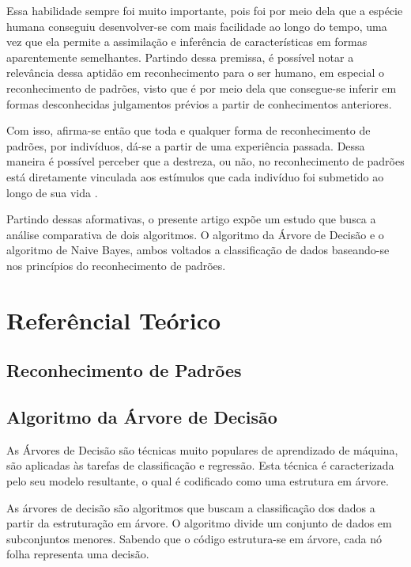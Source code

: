 \documentclass[preprint,12pt]{elsarticle}
\begin{document}
	Essa habilidade sempre foi muito importante, pois foi por meio dela que a esp\'ecie humana conseguiu desenvolver-se com mais facilidade ao longo do tempo, uma vez que ela permite a assimila\c c\~ao e infer\^encia de caracter\'isticas em formas aparentemente semelhantes. Partindo dessa premissa, \'e poss\'ivel notar a relev\^ancia dessa aptid\~ao em reconhecimento para o ser humano, em especial o reconhecimento de padr\~oes, visto que \'e por meio dela que consegue-se inferir em formas desconhecidas julgamentos pr\'evios a partir de conhecimentos anteriores.
	
	Com isso, afirma-se ent\~ao que toda e qualquer forma de reconhecimento de padr\~oes, por indiv\'iduos, d\'a-se a partir de uma experi\^encia passada. Dessa maneira \'e poss\'ivel perceber que a destreza, ou n\~ao, no reconhecimento de padr\~oes está diretamente vinculada aos est\'imulos que cada indiv\'iduo foi submetido ao longo de sua vida \cite{Prado:2008}.
	
	Partindo dessas aformativas, o presente artigo exp\~oe um estudo que busca a an\'alise comparativa de dois algoritmos. O algoritmo da \'Arvore de Decis\~ao e o algoritmo de Naive Bayes, ambos voltados a classifica\c c\~ao de dados baseando-se nos princ\'ipios do reconhecimento de padr\~oes.
	\section{Refer\^encial Te\'orico}
	\label{S:2}
	
	\subsection{Reconhecimento de Padr\~oes}
	
	\subsection{Algoritmo da \'Arvore de Decis\~ao}
	
	As  \'Arvores de Decis\~ao s\~ao t\'ecnicas muito populares de aprendizado de m\'aquina, s\~ao aplicadas \`as tarefas de classifica\c c\~ao e regress\~ao. Esta t\'ecnica \'e caracterizada pelo seu modelo resultante, o qual \'e codificado como uma estrutura em \'arvore\cite{Nuti:2019}. 
	
	As \'arvores de decis\~ao s\~ao algoritmos que buscam a classifica\c c\~ao dos dados a partir da estruturação em árvore. O algoritmo divide um conjunto de dados em subconjuntos menores. Sabendo que o c\'odigo estrutura-se em \'arvore, cada n\'o folha representa uma decis\~ao.
	
\end{document}
